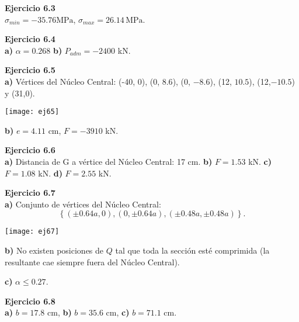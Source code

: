\textbf{Ejercicio 6.3}\\

$\sigma_{min} = -35.76 \text{MPa}$, $\sigma_{max} = 26.14 \, \text{MPa}$.\newline

\textbf{Ejercicio 6.4}\\

\textbf{a)} $\alpha = 0.268$
\textbf{b)} $P_{adm} = -2400 $ kN.\newline


\textbf{Ejercicio 6.5}\\

\textbf{a)} Vértices del Núcleo Central: (-40, 0), (0, $8.6$), (0, $-8.6$), (12, $10.5$), (12,$-10.5$) y (31,0).

\begin{center}
\texttt{[image: ej65]}
\end{center}

\textbf{b)} $e=4.11$ cm, $F=-3910$ kN.\newline

\textbf{Ejercicio 6.6}\\

\textbf{a)} Distancia de G a vértice del Núcleo Central: 17 cm. \textbf{b)} $F=1.53$ kN.
\textbf{c)}
$F=1.08$ kN.
\textbf{d)}
$F=2.55$ kN.\newline

\textbf{Ejercicio 6.7}\\

\textbf{a)} Conjunto de vértices del Núcleo Central: $$
\left\{(\pm 0.64a,0), (0, \pm 0.64a), (\pm 0.48a,\pm 0.48a)\right\}.
$$

\begin{center}
	\texttt{[image: ej67]}
\end{center}

\textbf{b)}
No existen posiciones de $Q$ tal que toda la sección esté comprimida (la resultante cae siempre fuera del Núcleo Central).

\textbf{c)}
$\alpha \leq 0.27$.\newline

\textbf{Ejercicio 6.8}\\

\textbf{a)} 
$b=17.8$ cm,
\textbf{b)} $b=35.6$ cm, \textbf{c)} $b=71.1$ cm.\newline

